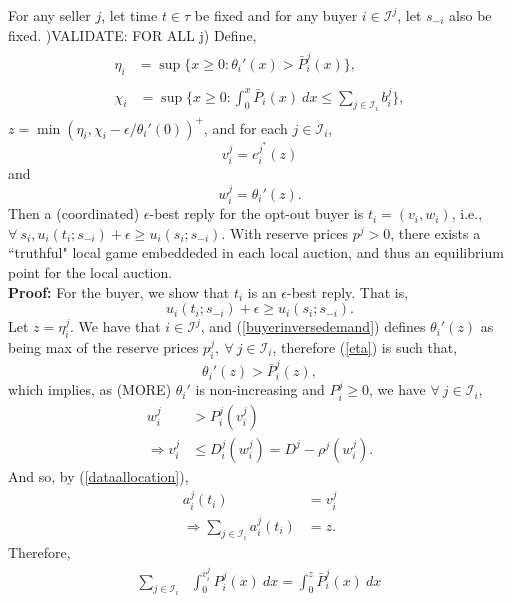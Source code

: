 \documentclass[12pt]{article}
\theoremstyle{definition}
\newcommand{\mcI}{\mathcal{I}}
\begin{document}
\begin{multicols}{2}
{
For any seller $j$, let time $t \in \tau$ be fixed and for any buyer $i\in
\mcI^j$, let $s_{-i}$ also be fixed. )VALIDATE: FOR ALL j) Define,
\begin{align}
\begin{split}\label{eta}
    \eta_i &= \sup\bigg\lbrace x\ge 0 : 
 {\theta_i}'(x) > \bar{P}_i^j(x)\bigg\rbrace, 
\end{split}\\
\begin{split}\label{chi}
    \chi_i &= \sup\bigg\lbrace x\ge 0: 
\displaystyle\int_0^x 
    \bar{P}_i(x) \ dx \le \sum_{j\in\mcI_i}b_i^j \bigg\rbrace,
\end{split}
\end{align}
$z = \min(\eta_i, \chi_i - \epsilon / \theta_i'(0))^+$, and for each $j \in
\mcI_i$, 
$$
    v_i^j = e_i^{j^*}(z) 
$$
and 
$$
    w_i^j = \theta_i'(z).%
$$
Then a (coordinated) $\epsilon$-best reply for the opt-out buyer is $t_i =
(v_i,w_i)$, i.e., $\forall \ s_i, u_i(t_i;s_{-i}) + \epsilon \ge u_i(s_i;
s_{-i})$.
With reserve prices $p^j >0$, there exists a ``truthful" local game embeddeded
in each local auction, and thus an equilibrium point for the local auction. 
}\\
\textbf{Proof:}
For the buyer, we show that $t_i$ is an $\epsilon$-best reply. That is,
$$
    u_i(t_i;s_{-i}) + \epsilon \ge u_i(s_i;s_{-i}).
$$
Let $z = \eta_i^j$. We have that $i\in\mcI^j$, 
and (\ref{buyerinversedemand}) defines $\theta_i'(z)$ as being
max of the reserve prices $p_i^j,\ \forall \ j\in\mcI_i$, therefore
(\ref{eta}) is such that,
$$
    \theta_i'(z) > \bar{P}_i^j(z),
$$ 
which implies, as (MORE) $\theta_i'$ is non-increasing and $P_i^j \ge 0$,
we have $\forall \ j \in \mcI_i$, 
\begin{align*}
    w_i^j &> P_i^j(v_i^j) \\
    \Rightarrow v_i^j &\le D_i^j(w_i^j) = D^j - \rho^j(w_i^j).
\end{align*}
And so, by (\ref{dataallocation}),
\begin{align*}
    a_i^j(t_i) &= v_i^j \\
    \Rightarrow \displaystyle\sum_{j\in\mcI_i} a_i^j(t_i) &= z.
\end{align*}
Therefore,
\begin{align*}
    \displaystyle\sum_{j\in\mcI_i}&\int_0^{v_i^j} P_i^j(x) \ dx =  \int_0^{z}
    \bar{P}_i^j(x) \ dx \\

\end{align*}
\end{multicols}
\end{document}
